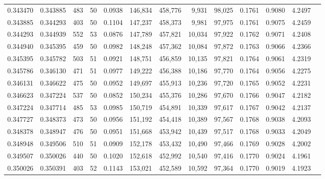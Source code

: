 \begin{tabular}{rrrrrrrrrrrrr}
0.343470 & 0.343885 &   483 &  50 &                                     0.0938 & 146,834 & 458,776 &   9,931 &  98,025 & 0.1761 & 0.9080 & 4.2497 \\
0.343885 & 0.344293 &   403 &  50 &                                     0.1104 & 147,237 & 458,373 &   9,981 &  97,975 & 0.1761 & 0.9075 & 4.2459 \\
0.344293 & 0.344939 &   552 &  53 &                                     0.0876 & 147,789 & 457,821 &  10,034 &  97,922 & 0.1762 & 0.9071 & 4.2408 \\
0.344940 & 0.345395 &   459 &  50 &                                     0.0982 & 148,248 & 457,362 &  10,084 &  97,872 & 0.1763 & 0.9066 & 4.2366 \\
0.345395 & 0.345782 &   503 &  51 &                                     0.0921 & 148,751 & 456,859 &  10,135 &  97,821 & 0.1764 & 0.9061 & 4.2319 \\
0.345786 & 0.346130 &   471 &  51 &                                     0.0977 & 149,222 & 456,388 &  10,186 &  97,770 & 0.1764 & 0.9056 & 4.2275 \\
0.346131 & 0.346622 &   475 &  50 &                                     0.0952 & 149,697 & 455,913 &  10,236 &  97,720 & 0.1765 & 0.9052 & 4.2231 \\
0.346623 & 0.347224 &   537 &  50 &                                     0.0852 & 150,234 & 455,376 &  10,286 &  97,670 & 0.1766 & 0.9047 & 4.2182 \\
0.347224 & 0.347714 &   485 &  53 &                                     0.0985 & 150,719 & 454,891 &  10,339 &  97,617 & 0.1767 & 0.9042 & 4.2137 \\
0.347727 & 0.348373 &   473 &  50 &                                     0.0956 & 151,192 & 454,418 &  10,389 &  97,567 & 0.1768 & 0.9038 & 4.2093 \\
0.348378 & 0.348947 &   476 &  50 &                                     0.0951 & 151,668 & 453,942 &  10,439 &  97,517 & 0.1768 & 0.9033 & 4.2049 \\
0.348948 & 0.349506 &   510 &  51 &                                     0.0909 & 152,178 & 453,432 &  10,490 &  97,466 & 0.1769 & 0.9028 & 4.2002 \\
0.349507 & 0.350026 &   440 &  50 &                                     0.1020 & 152,618 & 452,992 &  10,540 &  97,416 & 0.1770 & 0.9024 & 4.1961 \\
0.350026 & 0.350391 &   403 &  52 &                                     0.1143 & 153,021 & 452,589 &  10,592 &  97,364 & 0.1770 & 0.9019 & 4.1923 \\

\end{tabular}
